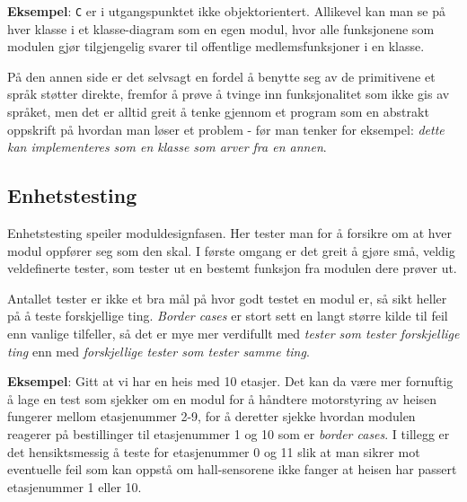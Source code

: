 \textbf{Eksempel}: \verb|C| er i utgangspunktet ikke objektorientert. Allikevel kan man se på hver klasse i et klasse-diagram som en egen modul, hvor alle funksjonene som modulen gjør tilgjengelig svarer til offentlige medlemsfunksjoner i en klasse.

På den annen side er det selvsagt en fordel å benytte seg av de primitivene et språk støtter direkte, fremfor å prøve å tvinge inn funksjonalitet som ikke gis av språket, men det er alltid greit å tenke gjennom et program som en abstrakt oppskrift på hvordan man løser et problem - før man tenker for eksempel: \textit{dette kan implementeres som en klasse som arver fra en annen}.

\subsection{Enhetstesting}


Enhetstesting speiler moduldesignfasen. Her tester man for å forsikre om at hver modul oppfører seg som den skal. I første omgang er det greit å gjøre små, veldig veldefinerte tester, som tester ut en bestemt funksjon fra modulen dere prøver ut.

Antallet tester er ikke et bra mål på hvor godt testet en modul er, så sikt heller på å teste forskjellige ting. \textit{Border cases} er stort sett en langt større kilde til feil enn vanlige tilfeller, så det er mye mer verdifullt med \textit{tester som tester forskjellige ting} enn med \textit{forskjellige tester som tester samme ting}.

\textbf{Eksempel}: Gitt at vi har en heis med 10 etasjer. Det kan da være mer fornuftig å lage en test som sjekker om en modul for å håndtere motorstyring av heisen fungerer mellom etasjenummer 2-9, for å deretter sjekke hvordan modulen reagerer på bestillinger til etasjenummer 1 og 10 som er \textit{border cases}. I tillegg er det hensiktsmessig å teste for etasjenummer 0 og 11 slik at man sikrer mot eventuelle feil som kan oppstå om hall-sensorene ikke fanger at heisen har passert etasjenummer 1 eller 10.



